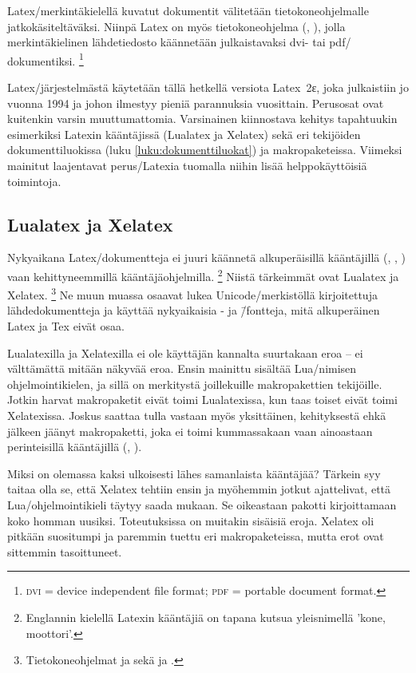 Latex\-/merkintäkielellä kuvatut dokumentit välitetään
tietokoneohjelmalle jatkokäsiteltäväksi. Niinpä Latex on myös
tietokoneohjelma (, ), jolla
merkintäkielinen lähdetiedosto käännetään julkaistavaksi dvi- tai pdf\-/
dokumentiksi.%
\footnote{\textsc{dvi} = device independent file format; \textsc{pdf} =
  portable document format.}

Latex\-/järjestelmästä käytetään tällä hetkellä versiota Latex~2ε, joka
julkaistiin jo vuonna 1994 ja johon ilmestyy pieniä parannuksia
vuosittain. Perusosat ovat kuitenkin varsin muuttumattomia. Varsinainen
kiinnostava kehitys tapahtuukin esimerkiksi Latexin kääntäjissä
(Lualatex ja Xelatex) sekä eri tekijöiden dokumenttiluokissa (luku
\ref{luku:dokumenttiluokat}) ja makropaketeissa. Viimeksi mainitut
laajentavat perus\-/Latexia tuomalla niihin lisää helppokäyttöisiä
toimintoja.

\subsection{Lualatex ja Xelatex}

Nykyaikana Latex\-/dokumentteja ei juuri käännetä alkuperäisillä
kääntäjillä (, , ) vaan
kehittyneemmillä kääntäjäohjelmilla.%
\footnote{Englannin kielellä Latexin kääntäjiä on tapana kutsua
  yleisnimellä \emph{} 'kone, moottori'.} Niistä
tärkeimmät ovat Lualatex ja Xelatex.%
\footnote{Tietokoneohjelmat  ja  sekä
   ja .} Ne muun muassa osaavat lukea
Unicode\-/merkistöllä kirjoitettuja lähdedokumentteja ja käyttää
nykyaikaisia - ja  \=/fontteja,
mitä alkuperäinen Latex ja Tex eivät osaa.

Lualatexilla ja Xelatexilla ei ole käyttäjän kannalta suurtakaan eroa --
ei välttämättä mitään näkyvää eroa. Ensin mainittu sisältää
Lua\-/nimisen ohjelmointikielen, ja sillä on merkitystä joillekuille
makropakettien tekijöille. Jotkin harvat makropaketit eivät toimi
Lualatexissa, kun taas toiset eivät toimi Xelatexissa. Joskus saattaa
tulla vastaan myös yksittäinen, kehityksestä ehkä jälkeen jäänyt
makropaketti, joka ei toimi kummassakaan vaan ainoastaan perinteisillä
kääntäjillä (, ).

Miksi on olemassa kaksi ulkoisesti lähes samanlaista kääntäjää? Tärkein
syy taitaa olla se, että Xelatex tehtiin ensin ja myöhemmin jotkut
ajattelivat, että Lua\-/ohjelmointikieli täytyy saada mukaan. Se
oikeastaan pakotti kirjoittamaan koko homman uusiksi. Toteutuksissa on
muitakin sisäisiä eroja. Xelatex oli pitkään suositumpi ja paremmin
tuettu eri makropaketeissa, mutta erot ovat sittemmin tasoittuneet.

